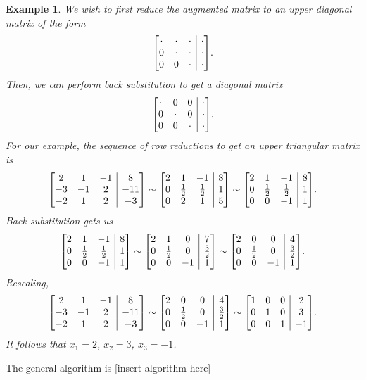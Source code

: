 \documentclass[11pt, a4paper]{article}
\makeatletter
\theoremstyle{break}
\newtheorem{eg}[thm]{Example}
\newenvironment{amatrix}[1]{%
	\left[\begin{array}{@{}*{#1}{c}|c@{}}
	}{%
	\end{array}\right]
}
\makeatother
\begin{document}
\begin{eg}
	We wish to first reduce the augmented matrix to an upper diagonal matrix of the form \[\begin{amatrix}{3}
		\cdot&\cdot&\cdot &\cdot\\0&\cdot&\cdot&\cdot\\0&0&\cdot&\cdot
	\end{amatrix}.\]
	Then, we can perform back substitution to get a diagonal matrix \[\begin{amatrix}{3}
		\cdot&0&0 &\cdot\\0&\cdot&0&\cdot\\0&0&\cdot&\cdot
	\end{amatrix}.\]
	For our example, the sequence of row reductions to get an upper triangular matrix is \[\begin{amatrix}{3}
		2&1&-1&8\\-3&-1&2&-11\\-2&1&2&-3
	\end{amatrix}\sim \begin{amatrix}{3}
	2&1&-1&8\\0&\frac12&\frac12&1\\0&2&1&5
	\end{amatrix}\sim\begin{amatrix}{3}
	2&1&-1&8\\0&\frac12&\frac12&1\\0&0&-1&1
	\end{amatrix}.\]
	Back substitution gets us \[\begin{amatrix}{3}
		2&1&-1&8\\0&\frac12&\frac12&1\\0&0&-1&1
	\end{amatrix}\sim\begin{amatrix}{3}
	2&1&0&7\\0&\frac12&0&\frac32\\0&0&-1&1
	\end{amatrix}\sim\begin{amatrix}{3}
	2&0&0&4\\0&\frac12&0&\frac32\\0&0&-1&1
	\end{amatrix}.\]
	Rescaling, \[\begin{amatrix}{3}
		2&1&-1&8\\-3&-1&2&-11\\-2&1&2&-3
	\end{amatrix}\sim\begin{amatrix}{3}
		2&0&0&4\\0&\frac12&0&\frac32\\0&0&-1&1
	\end{amatrix}\sim \begin{amatrix}{3}
	1&0&0&2\\0&1&0&3\\0&0&1&-1
	\end{amatrix}.\] It follows that $x_1=2$, $x_2=3$, $x_3=-1$.
\end{eg}
The general algorithm is [insert algorithm here]
\end{document}
